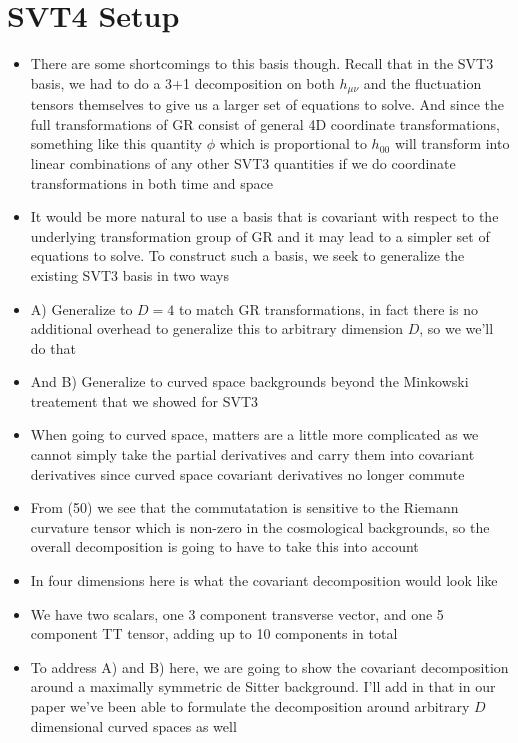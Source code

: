 \documentclass[10pt,letterpaper]{article}
\numberwithin{equation}{section}
\begin{document}

\section{SVT4 Setup}
\begin{itemize}
	\item There are some shortcomings to this basis though. Recall that in the SVT3 basis, we had to do a 3+1 decomposition on both $h_{\mu\nu}$ and the fluctuation tensors themselves to give us a larger set of equations to solve. And since the full transformations of GR consist of general 4D coordinate transformations, something like this quantity $\phi$ which is proportional to $h_{00}$ will transform into linear combinations of any other SVT3 quantities if we do coordinate transformations in both time and space
	\item It would be more natural to use a basis that is covariant with respect to the underlying transformation group of GR and it may lead to a simpler set of equations to solve. To construct such a basis, we seek to generalize the existing SVT3 basis in two ways
	\item A) Generalize to $D=4$ to match GR transformations, in fact there is no additional overhead to generalize this to arbitrary dimension $D$, so we we'll do that \vspace{1mm}
	\item And B) Generalize to curved space backgrounds beyond the Minkowski treatement that we showed for SVT3
	\item When going to curved space, matters are a little more complicated as we cannot simply take the partial derivatives and carry them into covariant derivatives since curved space covariant derivatives no longer commute
	\item From (50) we see that the commutatation is sensitive to the Riemann curvature tensor which is non-zero in the cosmological backgrounds, so the overall decomposition is going to have to take this into account
	\item In four dimensions here is what the covariant decomposition would look like
	\item We have two scalars, one 3 component transverse vector, and one 5 component TT tensor, adding up to 10 components in total
	\item To address A) and B) here, we are going to show the covariant decomposition around a maximally symmetric de Sitter background. I'll add in that in our paper we've been able to formulate the decomposition around arbitrary $D$ dimensional curved spaces as well 
\end{itemize}
\end{document}
